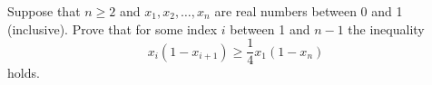Suppose that $n \geq 2$ and $x_1, x_2, \ldots, x_n$ are real numbers between 0 and 1 (inclusive). Prove that for some index $i$ between 1 and $n-1$ the inequality
\[ x_i(1 - x_{i+1}) \geq \frac{1}{4} x_1(1 - x_n) \]
holds.
